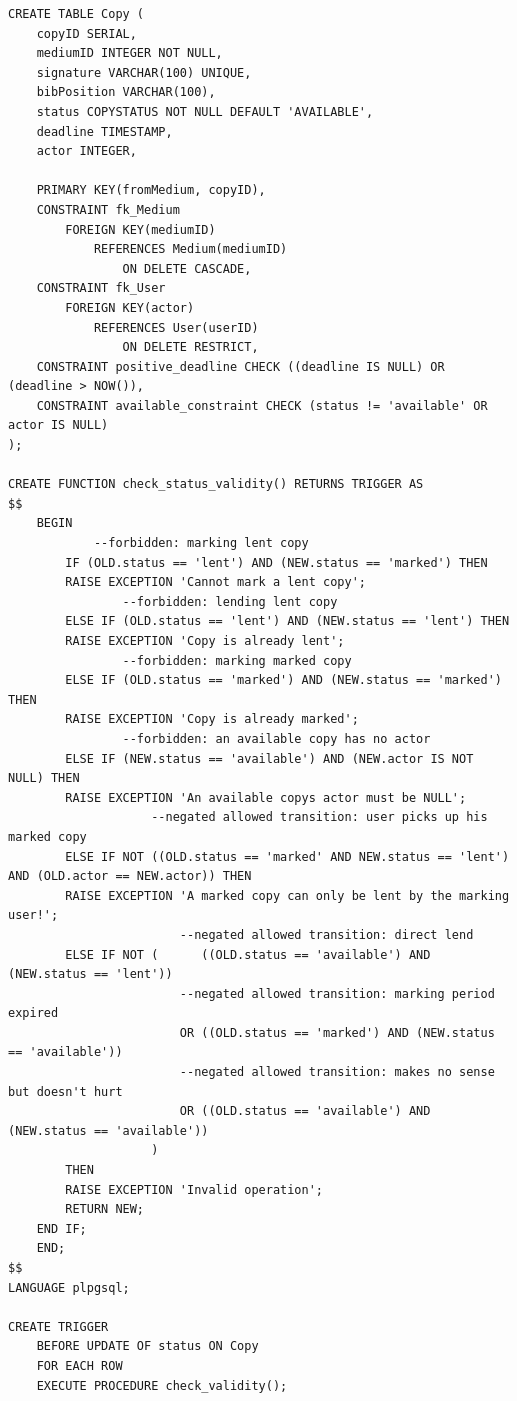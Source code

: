 \documentclass{article}
\begin{document}
\hypertarget{Copy}{}
\begin{lstlisting}
CREATE TABLE Copy ( 
	copyID SERIAL,
	mediumID INTEGER NOT NULL,
	signature VARCHAR(100) UNIQUE,
	bibPosition VARCHAR(100),
	status COPYSTATUS NOT NULL DEFAULT 'AVAILABLE',
	deadline TIMESTAMP,
	actor INTEGER,
	
	PRIMARY KEY(fromMedium, copyID),
	CONSTRAINT fk_Medium 
		FOREIGN KEY(mediumID) 
			REFERENCES Medium(mediumID) 
				ON DELETE CASCADE,
	CONSTRAINT fk_User 
		FOREIGN KEY(actor) 
			REFERENCES User(userID) 
				ON DELETE RESTRICT,
	CONSTRAINT positive_deadline CHECK ((deadline IS NULL) OR (deadline > NOW()),
	CONSTRAINT available_constraint CHECK (status != 'available' OR actor IS NULL)
);

CREATE FUNCTION check_status_validity() RETURNS TRIGGER AS 
$$
	BEGIN
			--forbidden: marking lent copy
		IF (OLD.status == 'lent') AND (NEW.status == 'marked') THEN 
		RAISE EXCEPTION 'Cannot mark a lent copy';
				--forbidden: lending lent copy
		ELSE IF (OLD.status == 'lent') AND (NEW.status == 'lent') THEN 
		RAISE EXCEPTION 'Copy is already lent';
				--forbidden: marking marked copy
		ELSE IF (OLD.status == 'marked') AND (NEW.status == 'marked') THEN 
		RAISE EXCEPTION 'Copy is already marked';
				--forbidden: an available copy has no actor
		ELSE IF (NEW.status == 'available') AND (NEW.actor IS NOT NULL) THEN 
		RAISE EXCEPTION 'An available copys actor must be NULL';
					--negated allowed transition: user picks up his marked copy
		ELSE IF NOT ((OLD.status == 'marked' AND NEW.status == 'lent') AND (OLD.actor == NEW.actor)) THEN
		RAISE EXCEPTION 'A marked copy can only be lent by the marking user!';	
						--negated allowed transition: direct lend
		ELSE IF NOT (	   ((OLD.status == 'available') AND (NEW.status == 'lent')) 
						--negated allowed transition: marking period expired
						OR ((OLD.status == 'marked') AND (NEW.status == 'available'))  
						--negated allowed transition: makes no sense but doesn't hurt
						OR ((OLD.status == 'available') AND (NEW.status == 'available'))
					) 
		THEN 
		RAISE EXCEPTION 'Invalid operation';
		RETURN NEW;
	END IF;
	END;
$$
LANGUAGE plpgsql;
   
CREATE TRIGGER 
	BEFORE UPDATE OF status ON Copy
	FOR EACH ROW 
	EXECUTE PROCEDURE check_validity();

\end{lstlisting}
\restoregeometry
\end{document}
